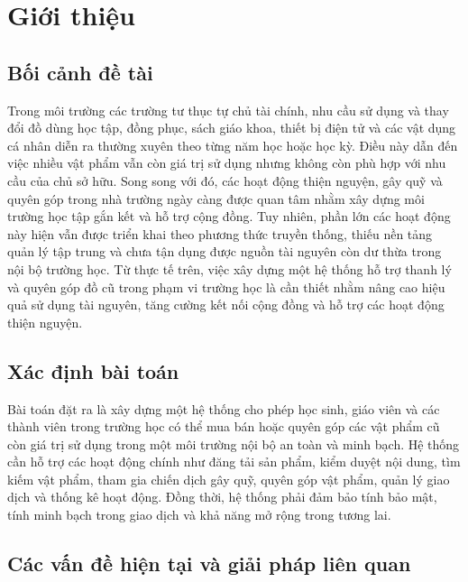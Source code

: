 \documentclass[12pt,a4paper]{report}
\begin{document}
\tableofcontents
\clearpage

\listoffigures
\clearpage

\listoftables
\clearpage



\chapter{Giới thiệu}

\section{Bối cảnh đề tài}

Trong môi trường các trường tư thục tự chủ tài chính, nhu cầu sử dụng và
thay đổi đồ dùng học tập, đồng phục, sách giáo khoa, thiết bị điện tử và các vật
dụng cá nhân diễn ra thường xuyên theo từng năm học hoặc học kỳ. Điều này dẫn
đến việc nhiều vật phẩm vẫn còn giá trị sử dụng nhưng không còn phù hợp với
nhu cầu của chủ sở hữu. Song song với đó, các hoạt động thiện nguyện, gây quỹ và
quyên góp trong nhà trường ngày càng được quan tâm nhằm xây dựng môi trường
học tập gắn kết và hỗ trợ cộng đồng. Tuy nhiên, phần lớn các hoạt động này hiện
vẫn được triển khai theo phương thức truyền thống, thiếu nền tảng quản lý tập
trung và chưa tận dụng được nguồn tài nguyên còn dư thừa trong nội bộ trường
học. Từ thực tế trên, việc xây dựng một hệ thống hỗ trợ thanh lý và
quyên góp đồ cũ trong phạm vi trường học là cần thiết nhằm nâng cao hiệu quả
sử dụng tài nguyên, tăng cường kết nối cộng đồng và hỗ trợ các hoạt động thiện
nguyện.

\section{Xác định bài toán}

Bài toán đặt ra là xây dựng một hệ thống cho phép học sinh, giáo viên và
các thành viên trong trường học có thể mua bán hoặc quyên góp các vật phẩm cũ
còn giá trị sử dụng trong một môi trường nội bộ an toàn và minh bạch. Hệ thống
cần hỗ trợ các hoạt động chính như đăng tải sản phẩm, kiểm duyệt nội dung, tìm
kiếm vật phẩm, tham gia chiến dịch gây quỹ, quyên góp vật phẩm, quản lý giao
dịch và thống kê hoạt động. Đồng thời, hệ thống phải đảm bảo tính bảo mật, tính
minh bạch trong giao dịch và khả năng mở rộng trong tương lai.

\section{Các vấn đề hiện tại và giải pháp liên quan}
\end{document}
